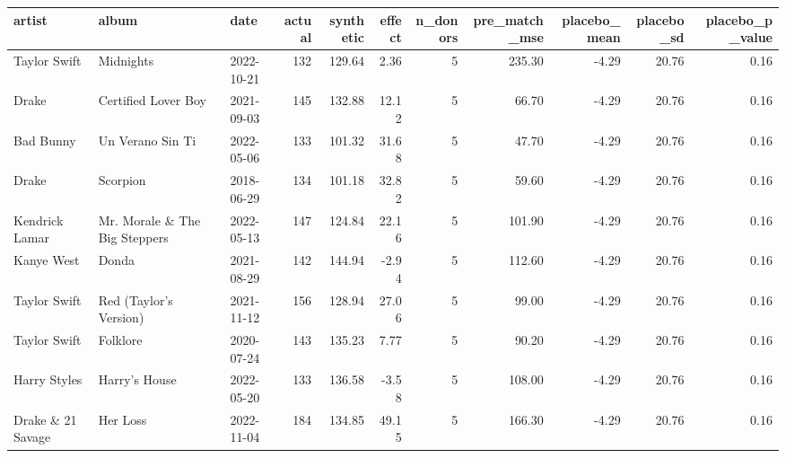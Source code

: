 \begin{tabular}{lllrrrrrrrr}
\toprule
artist & album & date & actual & synthetic & effect & n\_donors & pre\_match\_mse & placebo\_mean & placebo\_sd & placebo\_p\_value \\
\midrule
Taylor Swift & Midnights & 2022-10-21 & 132 & 129.64 & 2.36 & 5 & 235.30 & -4.29 & 20.76 & 0.16 \\
Drake & Certified Lover Boy & 2021-09-03 & 145 & 132.88 & 12.12 & 5 & 66.70 & -4.29 & 20.76 & 0.16 \\
Bad Bunny & Un Verano Sin Ti & 2022-05-06 & 133 & 101.32 & 31.68 & 5 & 47.70 & -4.29 & 20.76 & 0.16 \\
Drake & Scorpion & 2018-06-29 & 134 & 101.18 & 32.82 & 5 & 59.60 & -4.29 & 20.76 & 0.16 \\
Kendrick Lamar & Mr. Morale \& The Big Steppers & 2022-05-13 & 147 & 124.84 & 22.16 & 5 & 101.90 & -4.29 & 20.76 & 0.16 \\
Kanye West & Donda & 2021-08-29 & 142 & 144.94 & -2.94 & 5 & 112.60 & -4.29 & 20.76 & 0.16 \\
Taylor Swift & Red (Taylor's Version) & 2021-11-12 & 156 & 128.94 & 27.06 & 5 & 99.00 & -4.29 & 20.76 & 0.16 \\
Taylor Swift & Folklore & 2020-07-24 & 143 & 135.23 & 7.77 & 5 & 90.20 & -4.29 & 20.76 & 0.16 \\
Harry Styles & Harry's House & 2022-05-20 & 133 & 136.58 & -3.58 & 5 & 108.00 & -4.29 & 20.76 & 0.16 \\
Drake \& 21 Savage & Her Loss & 2022-11-04 & 184 & 134.85 & 49.15 & 5 & 166.30 & -4.29 & 20.76 & 0.16 \\
\bottomrule
\end{tabular}
